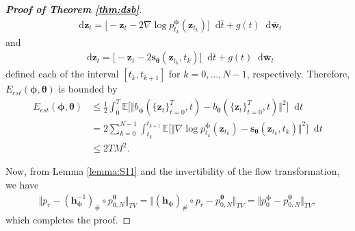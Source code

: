 \documentclass{article}
\theoremstyle{definition}
\theoremstyle{remark}
\newcommand*\diff{\mathop{}\!\mathrm{d}}
\begin{document}
\begin{proof}[\textbf{Proof of Theorem \ref{thm:dsb}}]
		\begin{align*}
		\diff\mathbf{z}_{t}=\Big[-\mathbf{z}_{t}-2\nabla\log{p_{t_{k}}^{\bm{\phi}}(\mathbf{z}_{t_{k}})}\Big]\diff\bar{t}+g(t)\diff\mathbf{\bar{w}}_{t}
		\end{align*}
		and
		\begin{align*}
		\diff\mathbf{z}_{t}=\Big[-\mathbf{z}_{t}-2\mathbf{s}_{\bm{\theta}}(\mathbf{z}_{t_{k}},t_{k})\Big]\diff\bar{t}+g(t)\diff\mathbf{\bar{w}}_{t}
		\end{align*}
		defined each of the interval $[t_{k},t_{k+1}]$ for $k=0,...,N-1$, respectively. Therefore, $E_{est}(\bm{\phi},\bm{\theta})$ is bounded by
		\begin{align*}
		E_{est}(\bm{\phi},\bm{\theta})&\le \frac{1}{2}\int_{0}^{T}\mathbb{E}\big[\Vert b_{\bm{\phi}}(\{\mathbf{z}_{t}\}_{t=0}^{T},t)-b_{\bm{\theta}}(\{\mathbf{z}_{t}\}_{t=0}^{T},t)\Vert^{2}\big]\diff t\\
		&= 2\sum_{k=0}^{N-1}\int_{t_{k}}^{t_{k+1}}\mathbb{E}\big[\Vert\nabla\log{p_{t_{k}}^{\bm{\phi}}(\mathbf{z}_{t_{k}})}-\mathbf{s}_{\bm{\theta}}(\mathbf{z}_{t_{k}},t_{k})\Vert^{2}\big]\diff t\\
		&\le 2TM^{2}.
		\end{align*}
		
		Now, from Lemma \ref{lemma:S11} and the invertibility of the flow transformation, we have
		\begin{align*}
		\Vert p_{r}-(\mathbf{h}_{\bm{\phi}}^{-1})_{\#}\circ p_{0,N}^{\bm{\theta}}\Vert_{TV}=\Vert (\mathbf{h}_{\bm{\phi}})_{\#}\circ p_{r}-p_{0,N}^{\bm{\theta}}\Vert_{TV}=\Vert p_{0}^{\bm{\phi}}-p_{0,N}^{\bm{\theta}}\Vert_{TV},
		\end{align*}
		which completes the proof.
	\end{proof}
	
\end{document}

